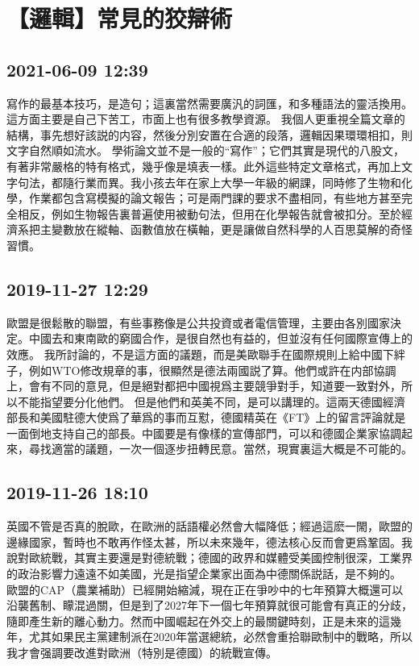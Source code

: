 \documentclass[twocolumn]{ctexart}
\begin{document}
\section*{【邏輯】常見的狡辯術}
\subsection*{2021-06-09 12:39}

寫作的最基本技巧，是造句；這裏當然需要廣汎的詞匯，和多種語法的靈活換用。這方面主要是自己下苦工，市面上也有很多教學資源。
我個人更重視全篇文章的結構，事先想好該説的内容，然後分別安置在合適的段落，邏輯因果環環相扣，則文字自然順如流水。
學術論文並不是一般的“寫作”；它們其實是現代的八股文，有著非常嚴格的特有格式，幾乎像是填表一樣。此外這些特定文章格式，再加上文字句法，都隨行業而異。我小孩去年在家上大學一年級的網課，同時修了生物和化學，作業都包含寫模擬的論文報告；可是兩門課的要求不盡相同，有些地方甚至完全相反，例如生物報告裏普遍使用被動句法，但用在化學報告就會被扣分。至於經濟系把主變數放在縱軸、函數值放在橫軸，更是讓做自然科學的人百思莫解的奇怪習慣。
\subsection*{2019-11-27 12:29}

歐盟是很鬆散的聯盟，有些事務像是公共投資或者電信管理，主要由各別國家決定。中國去和東南歐的窮國合作，是很自然也有益的，但並沒有任何國際宣傳上的效應。
我所討論的，不是這方面的議題，而是美歐聯手在國際規則上給中國下絆子，例如WTO修改規章的事，很顯然是德法兩國説了算。他們或許在内部協調上，會有不同的意見，但是絕對都把中國視爲主要競爭對手，知道要一致對外，所以不能指望要分化他們。
但是他們和英美不同，是可以講理的。這兩天德國經濟部長和美國駐德大使爲了華爲的事而互懟，德國精英在《FT》上的留言評論就是一面倒地支持自己的部長。中國要是有像樣的宣傳部門，可以和德國企業家協調起來，尋找適當的議題，一次一個逐步扭轉民意。當然，現實裏這大概是不可能的。
\subsection*{2019-11-26 18:10}

英國不管是否真的脫歐，在歐洲的話語權必然會大幅降低；經過這麽一閙，歐盟的邊緣國家，暫時也不敢再作怪太甚，所以未來幾年，德法核心反而會更爲鞏固。我說對歐統戰，其實主要還是對德統戰；德國的政界和媒體受美國控制很深，工業界的政治影響力遠遠不如美國，光是指望企業家出面為中德關係説話，是不夠的。 
歐盟的CAP（農業補助）已經開始縮減，現在正在爭吵中的七年預算大概還可以沿襲舊制、矇混過關，但是到了2027年下一個七年預算就很可能會有真正的分歧，隨即產生新的離心動力。然而中國崛起在外交上的最關鍵時刻，正是未來的這幾年，尤其如果民主黨建制派在2020年當選總統，必然會重拾聯歐制中的戰略，所以我才會强調要改進對歐洲（特別是德國）的統戰宣傳。
\end{document}
